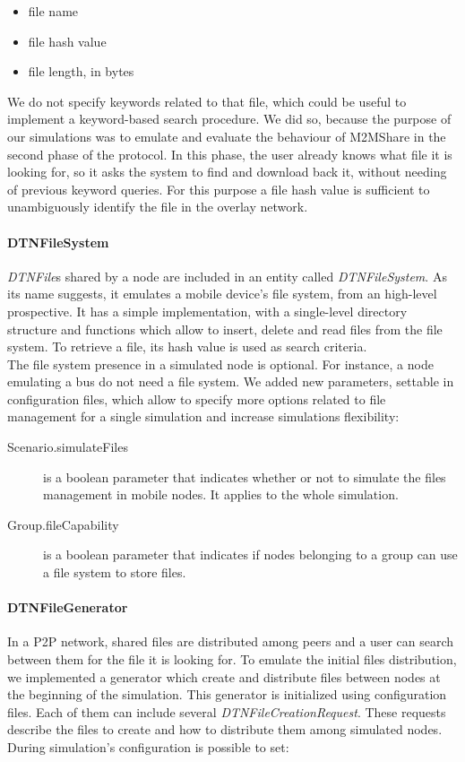 \begin{itemize}
\item file name
\item file hash value
\item file length, in bytes
\end{itemize}

We do not specify keywords related to that file, which could be useful to implement a keyword-based search procedure. We did so, because the purpose of our simulations was to emulate and evaluate the behaviour of M2MShare in the second phase of the protocol. In this phase, the user already knows what file it is looking for, so it asks the system to find and download back it, without needing of previous keyword queries. For this purpose a file hash value is sufficient to unambiguously identify the file in the overlay network.


\paragraph{DTNFileSystem}
\textit{DTNFile}s shared by a node are included in an entity called \textit{DTNFileSystem}. As its name suggests, it emulates a mobile device's file system, from an high-level prospective. It has a simple implementation, with a single-level directory structure and functions which allow to insert, delete and read files from the file system. To retrieve a file, its hash value is used as search criteria.
\\

The file system presence in a simulated node is optional. For instance, a node emulating a bus do not need a file system. We added new parameters, settable in configuration files, which allow to specify more options related to file management for a single simulation and increase simulations flexibility: 

\begin{description}
\item[Scenario.simulateFiles] is a boolean parameter that indicates whether or not to simulate the files management in mobile nodes. It applies to the whole simulation.
\item[Group.fileCapability] is a boolean parameter that indicates if nodes belonging to a group can use a file system to store files.
\end{description}

\paragraph{DTNFileGenerator}
\label{fileGeneratorImplementazione}
In a P2P network, shared files are distributed among peers and a user can search between them for the file it is looking for. To emulate the initial files distribution, we implemented a generator which create and distribute files between nodes at the beginning of the simulation. This generator is initialized using configuration files. Each of them can include several \textit{DTNFileCreationRequest}. These requests describe the files to create and how to distribute them among simulated nodes. During simulation's configuration is possible to set:

